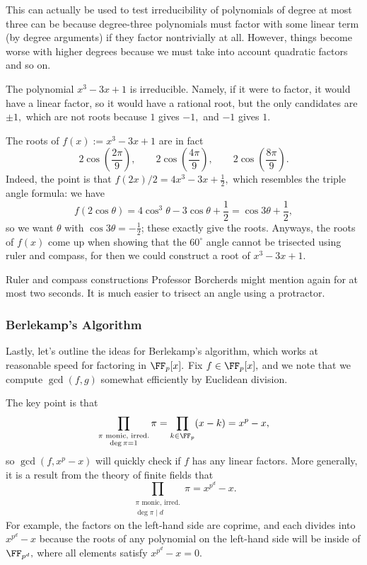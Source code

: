 This can actually be used to test irreducibility of polynomials of degree at most three can be because degree-three polynomials must factor with some linear term (by degree arguments) if they factor nontrivially at all. However, things become worse with higher degrees because we must take into account quadratic factors and so on.
\begin{example}
	The polynomial $x^3-3x+1$ is irreducible. Namely, if it were to factor, it would have a linear factor, so it would have a rational root, but the only candidates are $\pm1,$ which are not roots because $1$ gives $-1,$ and $-1$ gives $1.$
\end{example}
\begin{remark}
	The roots of $f(x):=x^3-3x+1$ are in fact
	\[2\cos\left(\frac{2\pi}9\right),\qquad2\cos\left(\frac{4\pi}9\right),\qquad2\cos\left(\frac{8\pi}9\right).\]
	Indeed, the point is that $f(2x)/2=4x^3-3x+\frac12,$ which resembles the triple angle formula: we have
	\[f(2\cos\theta)=4\cos^3\theta-3\cos\theta+\frac12=\cos3\theta+\frac12,\]
	so we want $\theta$ with $\cos3\theta=-\frac12$; these exactly give the roots. Anyways, the roots of $f(x)$ come up when showing that the $60^\circ$ angle cannot be trisected using ruler and compass, for then we could construct a root of $x^3-3x+1.$
\end{remark}
\begin{remark}
	Ruler and compass constructions Professor Borcherds might mention again for at most two seconds. It is much easier to trisect an angle using a protractor.
\end{remark}

\subsubsection{Berlekamp's Algorithm}
Lastly, let's outline the ideas for Berlekamp's algorithm, which works at reasonable speed for factoring in $\FF_p[x].$ Fix $f\in\FF_p[x],$ and we note that we compute $\gcd(f,g)$ somewhat efficiently by Euclidean division.

The key point is that
\[\prod_{\substack{\pi\text{ monic, irred.}\\\deg\pi=1}}\pi=\prod_{k\in\FF_p}(x-k)=x^p-x,\]
so $\gcd\left(f,x^p-x\right)$ will quickly check if $f$ has any linear factors. More generally, it is a result from the theory of finite fields that
\[\prod_{\substack{\pi\text{ monic, irred.}\\\deg\pi\mid d}}\pi=x^{p^d}-x.\]
For example, the factors on the left-hand side are coprime, and each divides into $x^{p^d}-x$ because the roots of any polynomial on the left-hand side will be inside of $\FF_{p^d},$ where all elements satisfy $x^{p^d}-x=0.$

